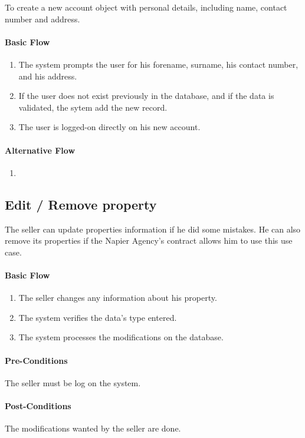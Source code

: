 \documentclass[a4paper,12pt]{article}
\begin{document}
To create a new account object with personal details, including name, contact number and address.

\paragraph{Basic Flow}
\begin{enumerate}
\item The system prompts the user for his forename, surname, his contact number, and his address.
\item If the user does not exist previously in the database, and if the data is validated, the sytem add the new record.
\item The user is logged-on directly on his new account.
\end{enumerate}
\paragraph{Alternative Flow}
\begin{enumerate}
\item
\end{enumerate}

\subsection{Edit / Remove property}

The seller can update properties information if he did some mistakes. He can also remove its properties if the Napier Agency's contract allows him to use this use case.

\paragraph{Basic Flow}
\begin{enumerate}
\item The seller changes any information about his property.
\item The system verifies the data's type entered.
\item The system processes the modifications on the database.
\end{enumerate}
\paragraph{Pre-Conditions}
The seller must be log on the system.
\paragraph{Post-Conditions}
The modifications wanted by the seller are done.
\end{document}
